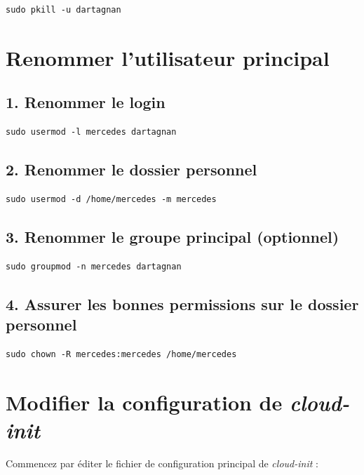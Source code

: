 \begin{lstlisting}[style=commandstyle]
sudo pkill -u dartagnan
\end{lstlisting}


\section{Renommer l'utilisateur principal}

\subsection*{1. Renommer le login}

\begin{lstlisting}[style=commandstyle]
sudo usermod -l mercedes dartagnan
\end{lstlisting}

\subsection*{2. Renommer le dossier personnel}

\begin{lstlisting}[style=commandstyle]
sudo usermod -d /home/mercedes -m mercedes
\end{lstlisting}

\subsection*{3. Renommer le groupe principal (optionnel)}

\begin{lstlisting}[style=commandstyle]
sudo groupmod -n mercedes dartagnan
\end{lstlisting}

\subsection*{4. Assurer les bonnes permissions sur le dossier personnel}

\begin{lstlisting}[style=commandstyle]
sudo chown -R mercedes:mercedes /home/mercedes
\end{lstlisting}


\section{Modifier la configuration de \textit{cloud-init}}

Commencez par éditer le fichier de configuration principal de \textit{cloud-init} :

